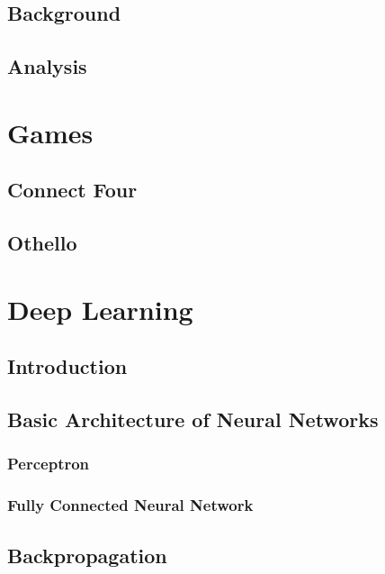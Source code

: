 \documentclass[titlepage]{article}
\begin{document}
\printnomenclature[3cm]

\newpage

\clearpage
{}

\newpage

\subsection{Background}
\subsection{Analysis}

\newpage

\section{Games}
\subsection{Connect Four}
\subsection{Othello}

\newpage

\section{Deep Learning}

\subsection{Introduction}

\newpage

\subsection{Basic Architecture of Neural Networks}
\subsubsection{Perceptron}
\subsubsection{Fully Connected Neural Network}

\newpage

\subsection{Backpropagation}
\end{document}
